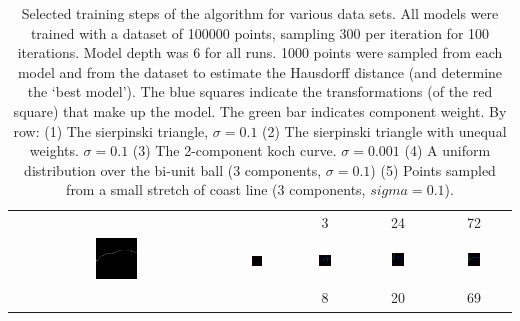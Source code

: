 \documentclass[10pt,a4paper,oneside]{article}
\theoremstyle{definition}
\begin{document}
\begin{table}[p]
\begin{tabular}{c c c c c}
\\   
 &   & 3  & 24 & 72 \\
	\includegraphics[width=0.2\textwidth]{../img/runs2d/coast/data.png}
& 
    \includegraphics[width=0.2\textwidth]{../img/runs2d/coast/generation0000.png}
& 
    \includegraphics[width=0.2\textwidth]{../img/runs2d/coast/generation0008.png}
& 
    \includegraphics[width=0.2\textwidth]{../img/runs2d/coast/generation0020.png}
& 
    \includegraphics[width=0.2\textwidth]{../img/runs2d/coast/generation0069.png}
\\
 &  & 8 & 20 & 69 \\
\hline 

\end{tabular}
\caption{Selected training steps of the algorithm for various data sets. All models were trained with a dataset of 100000 points, sampling 300 per iteration for 100 iterations. Model depth was 6 for all runs. 1000 points were sampled from each model and from the dataset to estimate the Hausdorff distance (and determine the `best model'). The blue squares indicate the transformations (of the red square) that make up the model. The green bar indicates component weight. By row: (1) The sierpinski triangle, $\sigma = 0.1$ (2) The sierpinski triangle with unequal weights. $\sigma = 0.1$ (3) The 2-component koch curve. $\sigma = 0.001$ (4) A uniform distribution over the bi-unit ball (3 components, $\sigma = 0.1$) (5) Points sampled from a small stretch of coast line (3 components, $sigma = 0.1$). }
\label{tablelabel}
\end{table}
\end{document}

